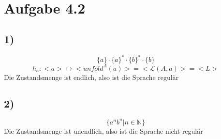 \section*{Aufgabe 4.2}
\subsection*{1)}
\[\{a\}\cdot\{a\}^*\cdot\{b\}^*\cdot\{b\}\]
\[h_a: <a> \mapsto <unfold^A(a)>=<\mathcal{L}(A,a)> = <L>\]
Die Zustandsmenge ist endlich, also ist die Sprache regulär
\subsection*{2)}
\[\{a^nb^n|n\in\mathbb{N}\}\]
Die Zustandsmenge ist unendlich, also ist die Sprache nicht regulär
